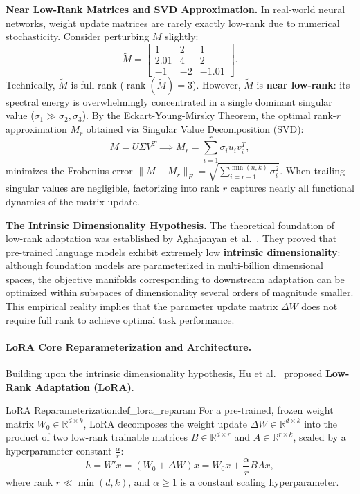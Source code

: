 \documentclass[../../../main.tex]{subfiles}
\begin{document}
\noindent\textbf{Near Low-Rank Matrices and SVD Approximation.}
In real-world neural networks, weight update matrices are rarely exactly low-rank due to numerical stochasticity. Consider perturbing $M$ slightly:
\begin{equation}
\tilde{M} = \begin{bmatrix} 1 & 2 & 1 \\ 2.01 & 4 & 2 \\ -1 & -2 & -1.01 \end{bmatrix}.
\end{equation}
Technically, $\tilde{M}$ is full rank ($\operatorname{rank}(\tilde{M}) = 3$). However, $\tilde{M}$ is \textbf{near low-rank}: its spectral energy is overwhelmingly concentrated in a single dominant singular value ($\sigma_1 \gg \sigma_2, \sigma_3$). By the Eckart-Young-Mirsky Theorem, the optimal rank-$r$ approximation $M_r$ obtained via Singular Value Decomposition (SVD):
\begin{equation}
M = U \Sigma V^T \implies M_r = \sum_{i=1}^r \sigma_i u_i v_i^T,
\end{equation}
minimizes the Frobenius error $\|M - M_r\|_F = \sqrt{\sum_{i=r+1}^{\min(n,k)} \sigma_i^2}$. When trailing singular values are negligible, factorizing into rank $r$ captures nearly all functional dynamics of the matrix update.

\noindent\textbf{The Intrinsic Dimensionality Hypothesis.}
The theoretical foundation of low-rank adaptation was established by Aghajanyan et al.~\citep{aghajanyan2020intrinsic}. They proved that pre-trained language models exhibit extremely low \textbf{intrinsic dimensionality}: although foundation models are parameterized in multi-billion dimensional spaces, the objective manifolds corresponding to downstream adaptation can be optimized within subspaces of dimensionality several orders of magnitude smaller. This empirical reality implies that the parameter update matrix $\Delta W$ does not require full rank to achieve optimal task performance.

\paragraph{LoRA Core Reparameterization and Architecture.}
Building upon the intrinsic dimensionality hypothesis, Hu et al.~\citep{hu2021lora} proposed \textbf{Low-Rank Adaptation (LoRA)}.

\begin{definition}{LoRA Reparameterization}{def_lora_reparam}
For a pre-trained, frozen weight matrix $W_0 \in \mathbb{R}^{d \times k}$, LoRA decomposes the weight update $\Delta W \in \mathbb{R}^{d \times k}$ into the product of two low-rank trainable matrices $B \in \mathbb{R}^{d \times r}$ and $A \in \mathbb{R}^{r \times k}$, scaled by a hyperparameter constant $\frac{\alpha}{r}$:
\begin{equation}
\label{eq:lora_forward}
h = W' x = (W_0 + \Delta W) x = W_0 x + \frac{\alpha}{r} B A x,
\end{equation}
where rank $r \ll \min(d, k)$, and $\alpha \ge 1$ is a constant scaling hyperparameter.
\end{definition}
\end{document}
